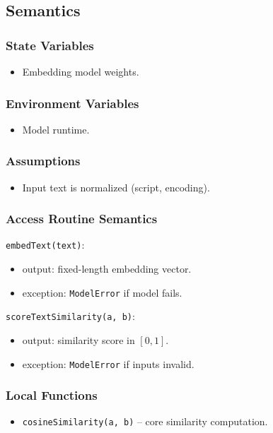 \documentclass[12pt, titlepage]{article}
\begin{document}
\subsection{Semantics}

\subsubsection{State Variables}
\begin{itemize}
    \item Embedding model weights.
\end{itemize}

\subsubsection{Environment Variables}
\begin{itemize}
    \item Model runtime.
\end{itemize}

\subsubsection{Assumptions}
\begin{itemize}
    \item Input text is normalized (script, encoding).
\end{itemize}

\subsubsection{Access Routine Semantics}

\noindent \texttt{embedText(text)}:
\begin{itemize}
    \item output: fixed-length embedding vector.
    \item exception: \texttt{ModelError} if model fails.
\end{itemize}

\noindent \texttt{scoreTextSimilarity(a, b)}:
\begin{itemize}
    \item output: similarity score in \([0, 1]\).
    \item exception: \texttt{ModelError} if inputs invalid.
\end{itemize}

\subsubsection{Local Functions}
\begin{itemize}
    \item \texttt{cosineSimilarity(a, b)} – core similarity computation.
\end{itemize}
\end{document}
